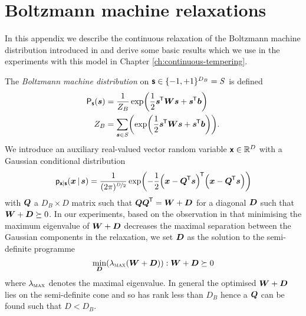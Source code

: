 \chapter{Boltzmann machine relaxations}\label{app:boltzmann-machine-relaxation}

In this appendix we describe the continuous relaxation of the Boltzmann machine distribution introduced in \citep{zhang2012continuous} and derive some basic results which we use in the experiments with this model in Chapter \ref{ch:continuous-tempering}.

The \emph{Boltzmann machine distribution} on $\boldsymbol{\mathsf{s}} \in \lbrace -1,+1\rbrace^{D_B} = \mathit{S}$ is defined
\begin{equation}
\begin{split}
  \prob{\rvct{s}}(\vct{s}) &= 
  \frac{1}{Z_B} \exp\lpa\frac{1}{2}\vct{s}\tr\mtx{W}\vct{s} + \vct{s}\tr\vct{b}\rpa
  \\
  Z_B &= \sum_{\vct{s}\in\set{S}} \lpa\exp\lpa\frac{1}{2}\vct{s}\tr\mtx{W}\vct{s} + \vct{s}\tr\vct{b}\rpa\rpa.
\end{split}
\end{equation}
\noindent
We introduce an auxiliary real-valued vector random variable $\boldsymbol{\mathsf{x}}\in\mathbb{R}^D$ with a Gaussian conditional distribution
\begin{equation}
  \pden{\rvct{x}|\rvct{s}}(\vct{x} \gvn \vct{s}) =
  \frac{1}{(2\pi)^{\nicefrac{D}{2}}} \exp\lpa 
    -\frac{1}{2} \lpa \vct{x} - \mtx{Q}\tr\vct{s} \rpa \tr \lpa \vct{x} - \mtx{Q}\tr\vct{s} \rpa 
  \rpa
\end{equation}
with $\boldsymbol{Q}$ a $D_B \times D$ matrix such that $\boldsymbol{Q}\boldsymbol{Q}^{\mkern-1.5mu\mathsf{T}} = \boldsymbol{W} + \boldsymbol{D}$ for a diagonal $\boldsymbol{D}$ such that $\boldsymbol{W} + \boldsymbol{D} \succeq 0$. In our experiments, based on the observation in \citep{zhang2012continuous} that minimising the maximum eigenvalue of $\boldsymbol{W} + \boldsymbol{D}$ decreases the maximal separation between the Gaussian components in the relaxation, we set $\boldsymbol{D}$ as the solution to the semi-definite programme 
\begin{equation}
  \min_{\mtx{D}} \lpa \lambda_{\textsc{max}}\lpa \mtx{W} + \mtx{D} \rpa \rpa 
  : \mtx{W} + \mtx{D} \succeq 0
\end{equation}
where $\lambda_{\textsc{max}}$ denotes the maximal eigenvalue. In general the optimised $\boldsymbol{W} + \boldsymbol{D}$ lies on the semi-definite cone and so has rank less than $D_B$ hence a $\boldsymbol{Q}$ can be found such that $D < D_B$.

